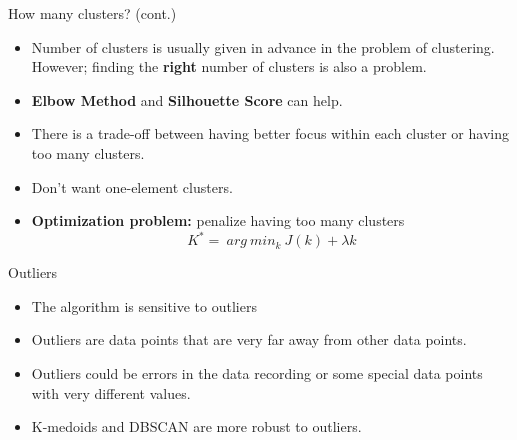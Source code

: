 \documentclass[serif, aspectratio=169]{beamer}
\begin{document}
\begin{frame}{How many clusters? (cont.)}
    \begin{itemize}
        \item Number of clusters is usually given in advance in the problem of clustering. However; finding the \textbf{right} number of clusters is also a problem.
        \item  \textbf{Elbow Method} and \textbf{Silhouette Score} can help.
        \item There is a trade-off between having better focus within each cluster or having too many clusters.
        \item  Don't want one-element clusters.
        \item \textbf{Optimization problem:} penalize having too many clusters
        \[
        K^* = \ arg \ min_k \  J(k) + \lambda k 
        \]
    \end{itemize}
\end{frame}

\begin{frame}{Outliers}
        \begin{itemize}
    \item The algorithm is sensitive to outliers
            \item Outliers are data points that are very far away from other data points. 
\item Outliers could be errors in the data recording or some special data points with very different values.
\item K-medoids  and DBSCAN are more robust to outliers.
        \end{itemize}
\end{frame}
\end{document}
